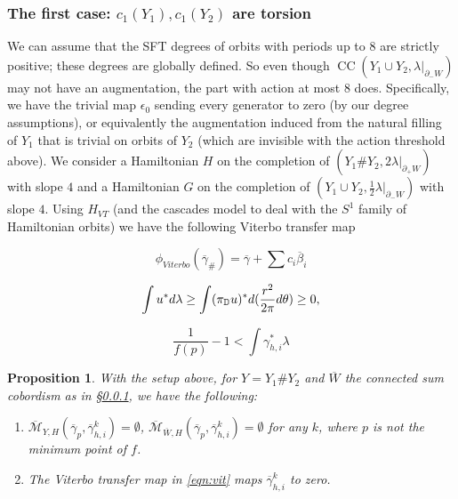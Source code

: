 \documentclass[10pt,a4paper]{amsart}
\newtheorem{proposition}{Proposition}
\DeclareMathOperator{\CC}{CC}
\def\D{{\mathbb D}}
\def\cM{{\mathcal M}}
\def\rd{{\rm d}}
\begin{document}
\subsubsection{The first case: $c_1(Y_1),c_1(Y_2)$ are torsion}\label{sss:421} We can assume that the SFT degrees of orbits with periods up to $8$ are strictly positive; these degrees are globally defined. So even though $\CC(Y_1\cup Y_2,\lambda|_{\partial_-W})$ may not have an augmentation, the part with action at most $8$ does. Specifically, we have the trivial map $\epsilon_0$ sending every generator to zero (by our degree assumptions), or equivalently the augmentation induced from the natural filling of $Y_1$ that is trivial on orbits of $Y_2$ (which are invisible with the action threshold above). We consider a Hamiltonian $H$ on the completion of $(Y_1\#Y_2, 2\lambda|_{\partial_+W})$ with slope $4$ and a Hamiltonian $G$ on the completion of $(Y_1\cup Y_2,\frac{1}{2}\lambda|_{\partial_-W})$ with slope $4$. Using $H_{VT}$ (and the cascades model to deal with the $S^1$ family of Hamiltonian orbits) we have the following Viterbo transfer map

\begin{equation}\label{eqn:vit}
    \phi_{Viterbo}(\overline{\gamma}_{\#})=\overline{\gamma}+\sum c_i\overline{\beta}_i
\end{equation}

\begin{equation}\label{eqn:area}
    \int u^*\rd\lambda \ge \int (\pi_{\D}u)^*\rd (\frac{r^2}{2\pi}\rd \theta)\ge 0,
\end{equation}

\begin{equation}\label{eqn:condition}
    \frac{1}{f(p)}-1<\int \gamma_{h,i}^*\lambda
\end{equation}

\begin{proposition}\label{prop:area}
    With the setup above, for $Y=Y_1\#Y_2$ and $\overline{W}$ the connected sum cobordism as in \S \ref{sss:421}, we have the following:
    \begin{enumerate}
        \item\label{a1} $\overline{\cM}_{Y,H}(\overline{\gamma}_p,\overline{\gamma}_{h,i}^k)=\emptyset$, $\overline{\cM}_{\overline{W},H}(\overline{\gamma}_p,\overline{\gamma}_{h,i}^k)=\emptyset$ for any $k$, where $p$ is not the minimum point of $f$.
        \item\label{a2}  The Viterbo transfer map in \eqref{eqn:vit} maps $\overline{\gamma}_{h,i}^k$ to zero.
    \end{enumerate}
\end{proposition}
\end{document}
